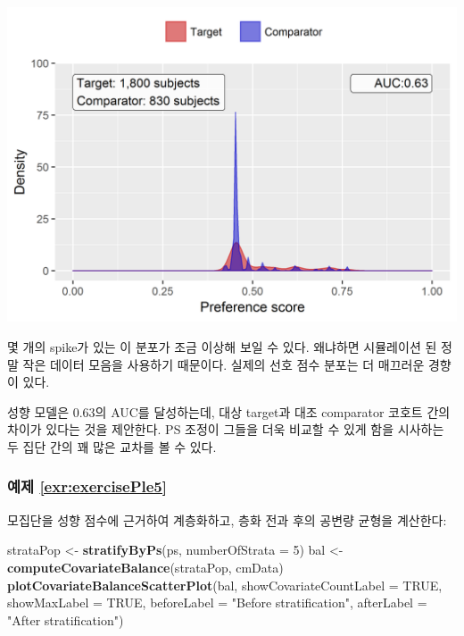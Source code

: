 \documentclass[10.5pt]{book}
\newenvironment{Shaded}{\begin{snugshade}}{\end{snugshade}}
\newcommand{\KeywordTok}[1]{\textcolor[rgb]{0.13,0.29,0.53}{\textbf{#1}}}
\newcommand{\DataTypeTok}[1]{\textcolor[rgb]{0.13,0.29,0.53}{#1}}
\newcommand{\DecValTok}[1]{\textcolor[rgb]{0.00,0.00,0.81}{#1}}
\newcommand{\StringTok}[1]{\textcolor[rgb]{0.31,0.60,0.02}{#1}}
\newcommand{\OtherTok}[1]{\textcolor[rgb]{0.56,0.35,0.01}{#1}}
\newcommand{\NormalTok}[1]{#1}
\theoremstyle{definition}
\theoremstyle{definition}
\theoremstyle{definition}
\theoremstyle{remark}
\begin{document}
\begin{center}\includegraphics[width=0.8\linewidth]{images/SuggestedAnswers/ps} \end{center}

몇 개의 spike가 있는 이 분포가 조금 이상해 보일 수 있다. 왜냐하면
시뮬레이션 된 정말 작은 데이터 모음을 사용하기 때문이다. 실제의 선호
점수 분포는 더 매끄러운 경향이 있다.

성향 모델은 0.63의 AUC를 달성하는데, 대상 target과 대조 comparator
코호트 간의 차이가 있다는 것을 제안한다. PS 조정이 그들을 더욱 비교할 수
있게 함을 시사하는 두 집단 간의 꽤 많은 교차를 볼 수 있다.

\subsubsection*{예제 \ref{exr:exercisePle5}}\label{-refexrexerciseple5}

모집단을 성향 점수에 근거하여 계층화하고, 층화 전과 후의 공변량 균형을
계산한다:

\begin{Shaded}
\begin{Highlighting}[]
\NormalTok{strataPop <-}\StringTok{ }\KeywordTok{stratifyByPs}\NormalTok{(ps, }\DataTypeTok{numberOfStrata =} \DecValTok{5}\NormalTok{)}
\NormalTok{bal <-}\StringTok{ }\KeywordTok{computeCovariateBalance}\NormalTok{(strataPop, cmData)}
\KeywordTok{plotCovariateBalanceScatterPlot}\NormalTok{(bal, }
                                \DataTypeTok{showCovariateCountLabel =} \OtherTok{TRUE}\NormalTok{, }
                                \DataTypeTok{showMaxLabel =} \OtherTok{TRUE}\NormalTok{, }
                                \DataTypeTok{beforeLabel =} \StringTok{"Before stratification"}\NormalTok{, }
                                \DataTypeTok{afterLabel =} \StringTok{"After stratification"}\NormalTok{)}
\end{Highlighting}
\end{Shaded}
\end{document}
